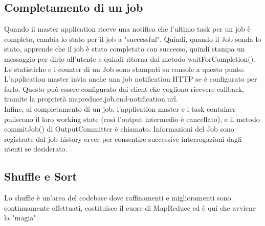 \subsection{Completamento di un job}
Quando il master application riceve una notifica che l'ultimo task per un job è completo, cambia lo stato per il job a "successful". Quindi, quando il Job sonda lo stato, apprende che il job è stato completato con successo, quindi stampa un messaggio per dirlo all'utente e quindi ritorna dal metodo waitForCompletion(). Le statistiche e i counter di un Job sono stampati su console a questo punto. \\
L'application master invia anche una job notification HTTP se è configurato per farlo. Questo può essere configurato dai client che vogliono ricevere callback, tramite la proprietà mapreduce.job.end-notification.url. \\
Infine, al completamento di un job, l'application master e i task container puliscono il loro working state (così l'output intermedio è cancellato), e il metodo commitJob() di OutputCommitter è chiamato. Informazioni del Job sono registrate dal job history erver per consentire successive interrogazioni dagli utenti se desiderato.
\subsection{Shuffle e Sort}
Lo shuffle è un'area del codebase dove raffinamenti e miglioramenti sono continuamente effettuati, costituisce il cuore di MapReduce ed è qui che avviene la "magia".
